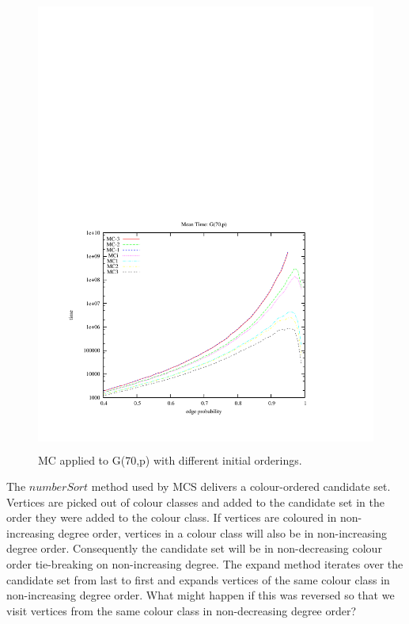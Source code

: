 \documentclass{l4proj}
\begin{document}
\begin{figure}
\vspace{-7cm}
\begin{center}
\includegraphics[height=15.0cm]{mc-70.pdf}
\end{center}
\vspace{-1cm}
\caption{MC applied to G(70,p) with different initial orderings.}
\label{mc-70}
\end{figure}

The $numberSort$ method used by MCS delivers a colour-ordered candidate set. Vertices are picked out of colour classes
and added to the candidate set in the order they were added to the colour class. If vertices are coloured in 
non-increasing degree order, vertices in a colour class will also be in non-increasing degree order. Consequently the candidate set
will be in non-decreasing colour order tie-breaking on non-increasing degree. The expand method iterates over the candidate
set from last to first and expands vertices of the same colour class in non-increasing degree order. What might happen if 
this was reversed so that we visit vertices from the same colour class in non-decreasing degree order? 
\end{document}
